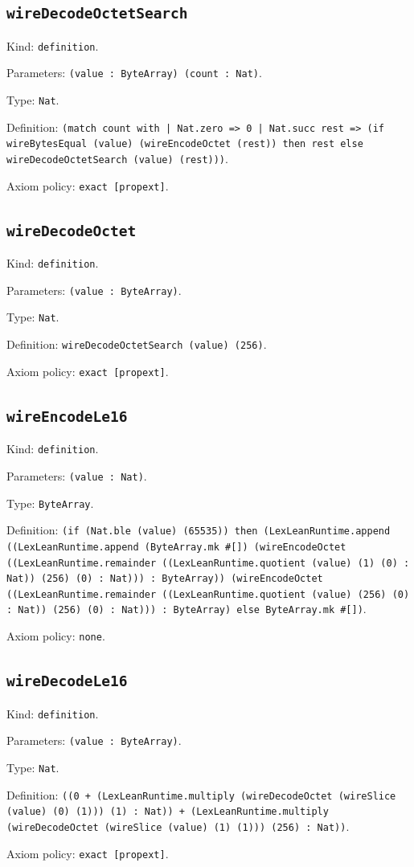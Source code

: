 \documentclass[11pt]{article}
\begin{document}
\subsection*{\texttt{wireDecodeOctetSearch}}
\noindent Kind: \texttt{definition}.\par
\noindent Parameters: \texttt{(value : ByteArray) (count : Nat)}.\par
\noindent Type: \texttt{Nat}.\par
\noindent Definition: \texttt{(match count with | Nat.zero => 0 | Nat.succ rest => (if wireBytesEqual (value) (wireEncodeOctet (rest)) then rest else wireDecodeOctetSearch (value) (rest)))}.\par
\noindent Axiom policy: \texttt{exact [propext]}.\par
\subsection*{\texttt{wireDecodeOctet}}
\noindent Kind: \texttt{definition}.\par
\noindent Parameters: \texttt{(value : ByteArray)}.\par
\noindent Type: \texttt{Nat}.\par
\noindent Definition: \texttt{wireDecodeOctetSearch (value) (256)}.\par
\noindent Axiom policy: \texttt{exact [propext]}.\par
\subsection*{\texttt{wireEncodeLe16}}
\noindent Kind: \texttt{definition}.\par
\noindent Parameters: \texttt{(value : Nat)}.\par
\noindent Type: \texttt{ByteArray}.\par
\noindent Definition: \texttt{(if (Nat.ble (value) (65535)) then (LexLeanRuntime.append ((LexLeanRuntime.append (ByteArray.mk \#[]) (wireEncodeOctet ((LexLeanRuntime.remainder ((LexLeanRuntime.quotient (value) (1) (0) : Nat)) (256) (0) : Nat))) : ByteArray)) (wireEncodeOctet ((LexLeanRuntime.remainder ((LexLeanRuntime.quotient (value) (256) (0) : Nat)) (256) (0) : Nat))) : ByteArray) else ByteArray.mk \#[])}.\par
\noindent Axiom policy: \texttt{none}.\par
\subsection*{\texttt{wireDecodeLe16}}
\noindent Kind: \texttt{definition}.\par
\noindent Parameters: \texttt{(value : ByteArray)}.\par
\noindent Type: \texttt{Nat}.\par
\noindent Definition: \texttt{((0 + (LexLeanRuntime.multiply (wireDecodeOctet (wireSlice (value) (0) (1))) (1) : Nat)) + (LexLeanRuntime.multiply (wireDecodeOctet (wireSlice (value) (1) (1))) (256) : Nat))}.\par
\noindent Axiom policy: \texttt{exact [propext]}.\par
\end{document}
